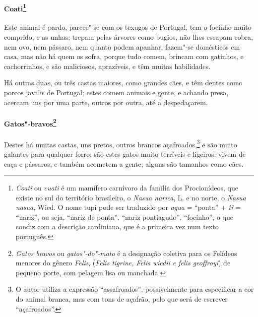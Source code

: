 \paragraph{Coati\footnote{ \textit{Coati} ou \textit{cuati} é
um mamífero carnívoro da família dos Procionídeos, que existe no sul do
território brasileiro, o \textit{Nasua narica}, L. e no norte, o
\textit{Nasua nasua}, Wied. O nome tupi pode ser traduzido por
\textit{agua} = ``ponta'' + \textit{tî} = ``nariz'', ou seja, ``nariz de
ponta'', ``nariz pontiagudo'', ``focinho'', o que condiz com a descrição
cardiniana, que é a primeira vez num texto português.}} Este animal
é pardo, parece"-se com os texugos de Portugal, tem o focinho muito
comprido, e as unhas; trepam pelas árvores como bugios, não lhes
escapam cobra, nem ovo, nem pássaro, nem quanto podem apanhar; fazem"-se
domésticos em casa, mas não há quem os sofra, porque tudo comem, brincam
com gatinhos, e cachorrinhos, e são maliciosos, aprazíveis, e têm
muitas habilidades.

 Há outras duas, ou três castas maiores, como grandes cães, e têm dentes
como porcos javalis de Portugal; estes comem animais e gente, e achando
presa, acercam uns por uma parte, outros por outra, até a despedaçarem.

\paragraph{Gatos"-bravos\footnote{ \textit{Gatos bravos} ou
\textit{gatos"-do"-mato} é a designação coletiva para os Felídeos
menores do gênero \textit{Felis}, (\textit{Felis tigrine, Felis wiedii e felis
geoffroyi}) de pequeno porte, com pelagem lisa ou manchada.}} 
Destes há muitas castas, uns pretos, outros brancos açafroados,\footnote{ O autor utiliza a expressão ``assafroados'', 
possivelmente para especificar a cor do animal branca, mas com tons de
açafrão, pelo que será de escrever ``açafroados''.} e são muito
galantes para qualquer forro; são estes gatos muito terríveis e
ligeiros: vivem de caça e pássaros, e também acometem a gente; alguns
são tamanhos como cães. 

